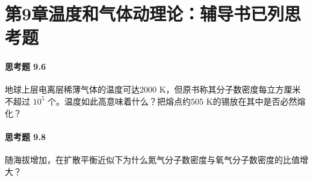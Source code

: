 \section*{第9章\quad 温度和气体动理论：辅导书已列思考题}
\paragraph{思考题 9.6}
地球上层电离层稀薄气体的温度可达2000 K，但原书称其分子数密度每立方厘米不超过 \(10^5\) 个。温度如此高意味着什么？把熔点约505 K的锡放在其中是否必然熔化？

\paragraph{思考题 9.8}
随海拔增加，在扩散平衡近似下为什么氮气分子数密度与氧气分子数密度的比值增大？
